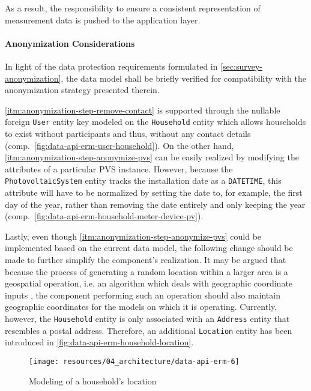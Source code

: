 As a result, the responsibility to ensure a consistent representation of measurement data is pushed to the application layer.


\paragraph{Anonymization Considerations}
In light of the data protection requirements formulated in \autoref{sec:survey-anonymization}, the data model shall be briefly verified for compatibility with the anonymization strategy presented therein.

\ref{itm:anonymization-step-remove-contact} is supported through the nullable foreign \texttt{User} entity key modeled on the \texttt{Household} entity which allows households to exist without participants and thus, without any contact details (comp.~\autoref{fig:data-api-erm-user-household}). On the other hand, \ref{itm:anonymization-step-anonymize-pvs} can be easily realized by modifying the attributes of a particular \acs{PVS} instance. However, because the \texttt{PhotovoltaicSystem} entity tracks the installation date as a \texttt{DATETIME}, this attribute will have to be normalized by setting the date to, for example, the first day of the year, rather than removing the date entirely and only keeping the year (comp.~\autoref{fig:data-api-erm-household-meter-device-pv}).

Lastly, even though \ref{itm:anonymization-step-anonymize-pvs} could be implemented based on the current data model, the following change should be made to further simplify the component's realization. It may be argued that because the process of generating a random location within a larger area is a geospatial operation, i.e. an algorithm which deals with geographic coordinate inputs \cite{de2007geospatial}, the component performing such an operation should also maintain geographic coordinates for the models on which it is operating. Currently, however, the \texttt{Household} entity is only associated with an \texttt{Address} entity that resembles a postal address. Therefore, an additional \texttt{Location} entity has been introduced in \autoref{fig:data-api-erm-household-location}.

\begin{figure}[hbt]
  \centering
  \texttt{[image: resources/04\_architecture/data-api-erm-6]}
  \caption{Modeling of a household's location}
  \label{fig:data-api-erm-household-location}
\end{figure}

